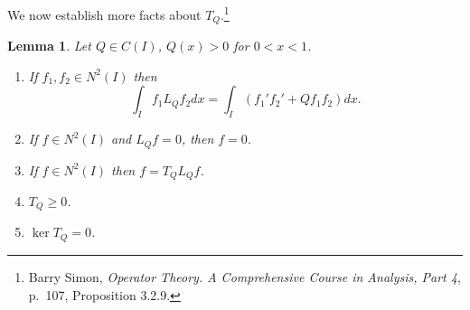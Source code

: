 \documentclass{article}
\newtheorem{lemma}[theorem]{Lemma}
\theoremstyle{definition}
\begin{document}
We now establish more facts about $T_Q$.\footnote{Barry Simon, {\em Operator Theory. A Comprehensive Course in Analysis, Part 4},
p.~107, Proposition 3.2.9.}


\begin{lemma}
Let $Q \in C(I)$, $Q(x)>0$ for $0<x<1$. 
\begin{enumerate}
\item If $f_1,f_2 \in N^2(I)$ then
\[
\int_I f_1 L_Q f_2dx = \int_I (f_1'f_2'+Qf_1f_2) dx.
\]

\item If $f \in N^2(I)$  and $L_Qf =0$, then $f=0$.


\item If $f \in N^2(I)$ then $f=T_Q L_Qf$.

\item $T_Q \geq 0$.

\item $\ker T_Q=0$.
\end{enumerate}
\label{329}
\end{lemma}
\end{document}
